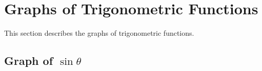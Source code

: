 \documentclass[10pt,a4paper,titlepage,twoside,openright]{report}
\begin{document}
\section{Graphs of Trigonometric Functions}

This section describes the graphs of trigonometric functions.

\subsection{Graph of $\sin \theta$}
\end{document}
